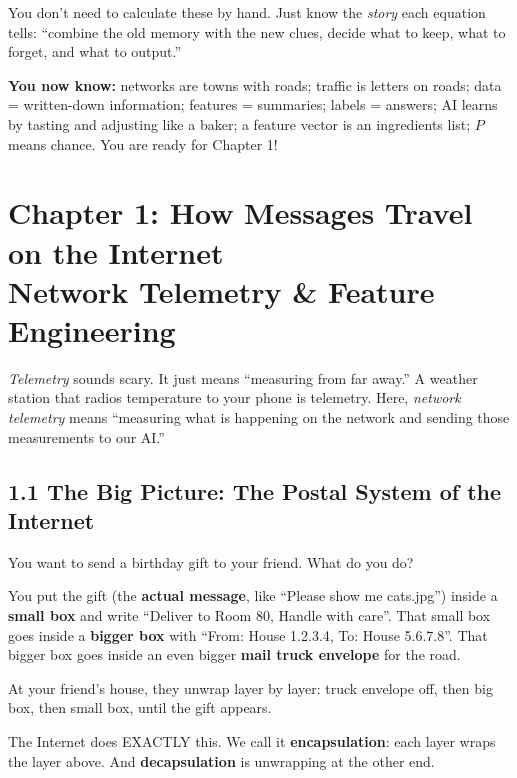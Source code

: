 \documentclass[11pt,a4paper]{article}
\begin{document}
You don't need to calculate these by hand. Just know the \emph{story} each
equation tells: ``combine the old memory with the new clues, decide what to
keep, what to forget, and what to output.''

\begin{recap}
\textbf{You now know:} networks are towns with roads; traffic is letters on
roads; data = written-down information; features = summaries; labels = answers;
AI learns by tasting and adjusting like a baker; a feature vector is an
ingredients list; $P$ means chance. You are ready for Chapter 1!
\end{recap}

\newpage

\section{Chapter 1: How Messages Travel on the Internet \\
\small Network Telemetry \& Feature Engineering}

\emph{Telemetry} sounds scary. It just means ``measuring from far away.'' A
weather station that radios temperature to your phone is telemetry. Here,
\emph{network telemetry} means ``measuring what is happening on the network
and sending those measurements to our AI.''

\subsection{1.1 The Big Picture: The Postal System of the Internet}
\label{sec:tcpip}

\begin{imaginebox}
You want to send a birthday gift to your friend. What do you do?

You put the gift (the \textbf{actual message}, like ``Please show me
cats.jpg'') inside a \textbf{small box} and write ``Deliver to Room 80,
Handle with care''. That small box goes inside a \textbf{bigger box} with
``From: House 1.2.3.4, To: House 5.6.7.8''. That bigger box goes inside an
even bigger \textbf{mail truck envelope} for the road.

At your friend's house, they unwrap layer by layer: truck envelope off,
then big box, then small box, until the gift appears.

The Internet does EXACTLY this. We call it \textbf{encapsulation}: each layer
wraps the layer above. And \textbf{decapsulation} is unwrapping at the other
end.
\end{imaginebox}
\end{document}

